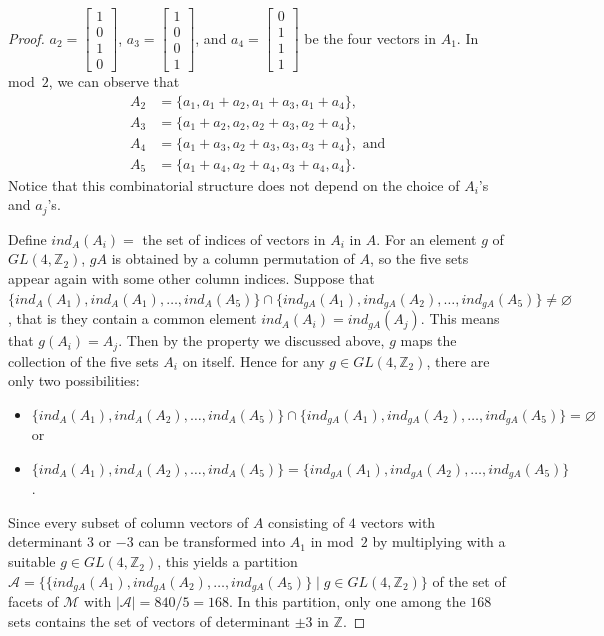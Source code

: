 \documentclass[10pt,a4paper]{amsart}
\newcommand{\Z}{\mathbb{Z}}
\newcommand{\cA}{\mathcal{A}}
\newcommand{\cM}{\mathcal{M}}
\begin{document}
\begin{proof}
    $a_2 = \begin{bmatrix}
    	1 \\
    	0 \\
    	1 \\
    	0
    \end{bmatrix}$, 
    $a_3 = \begin{bmatrix}
    	1 \\
    	0 \\
    	0 \\
    	1
    \end{bmatrix}$, and 
    $a_4 = \begin{bmatrix}
    	0 \\
    	1 \\
    	1 \\
    	1
    \end{bmatrix}$
    be the four vectors in $A_1$.
    In mod~$2$, we can observe that \begin{align*}
    	A_2 &= \{a_1, a_1+a_2, a_1+a_3, a_1+a_4 \}, \\
    	A_3 &= \{a_1 + a_2, a_2, a_2+a_3, a_2+a_4 \}, \\
    	A_4 &= \{a_1 + a_3, a_2 + a_3, a_3, a_3+a_4\}, \text{ and } \\
    	A_5 &= \{a_1 + a_4, a_2 + a_4, a_3+a_4, a_4 \}.
    \end{align*}
    Notice that this combinatorial structure does not depend on the choice of $A_i$'s and $a_j$'s.

    Define $ind_A(A_i) = $ the set of indices of vectors in $A_i$ in $A$.
    For an element $g$ of $GL(4, \Z_2)$, $gA$ is obtained by a column permutation of $A$, so the five sets appear again with some other column indices.
    Suppose that $\{ind_A(A_1), ind_A(A_1), \ldots, ind_A(A_5)\} \cap \{ind_{gA}(A_1), ind_{gA}(A_2), \ldots, ind_{gA}(A_5)\} \not= \varnothing$, that is they contain a common element $ind_A(A_i) = ind_{gA}(A_j)$.
    This means that $g(A_i) = A_j$.
    Then by the property we discussed above, $g$ maps the collection of the five sets $A_i$ on itself.
    Hence for any $g \in GL(4, \Z_2)$, there are only two possibilities:
    \begin{itemize}
    	\item $\{ind_A(A_1), ind_A(A_2), \ldots, ind_A(A_5)\} \cap \{ind_{gA}(A_1), ind_{gA}(A_2), \ldots, ind_{gA}(A_5)\} = \varnothing$ or
    	\item $\{ind_A(A_1), ind_A(A_2), \ldots, ind_A(A_5)\} = \{ind_{gA}(A_1), ind_{gA}(A_2), \ldots, ind_{gA}(A_5)\}$.
    \end{itemize}
    Since every subset of column vectors of $A$ consisting of $4$ vectors with determinant $3$ or $-3$ can be transformed into $A_1$ in mod~$2$ by multiplying with a suitable $g \in GL(4, \Z_2)$, this yields a partition $\cA = \{\{ind_{gA}(A_1), ind_{gA}(A_2), \ldots, ind_{gA}(A_5)\} \mid g \in GL(4, \Z_2) \}$ of the set of facets of $\cM$ with $|\cA| = 840/5 =168$.
    In this partition, only one among the $168$ sets contains the set of vectors of determinant $\pm 3$ in $\Z$.


\end{proof}
\end{document}
